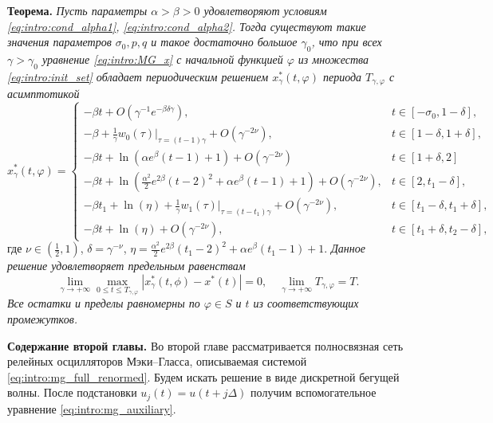 \textbf{Теорема.} \textit{Пусть параметры $\alpha > \beta > 0$ удовлетворяют условиям \eqref{eq:intro:cond_alpha1}, \eqref{eq:intro:cond_alpha2}. Тогда существуют такие значения параметров $\sigma_0, p, q$ и такое достаточно большое $\gamma_0$, что при всех $\gamma > \gamma_0$ уравнение \eqref{eq:intro:MG_x} с начальной функцией $\varphi$ из множества \eqref{eq:intro:init_set} обладает периодическим решением $x^*_\gamma(t, \varphi)$ периода $T_{\gamma, \varphi}$ с асимптотикой}
\footnotesize
\begin{equation}
	\label{eq:intro:sol_x*gamma}
	x^*_\gamma(t, \varphi)= 
	\begin{cases}
		- \beta t + O(\gamma^{-1} e^{-\beta \delta \gamma}), & t\in[-\sigma_0, 1 - \delta],\\
		-\beta + \frac{1}{\gamma} w_0(\tau)|_{\tau=(t - 1)\gamma} + O(\gamma^{-2\nu}), & t \in [1 - \delta,1 + \delta],\\
		- \beta t + \ln(\alpha e^{\beta}(t - 1) + 1) + O(\gamma^{-2\nu}) & t\in[1 + \delta, 2]\\
		- \beta t + \ln(\frac{\alpha^2}{2}e^{2 \beta}(t - 2)^2 + \alpha e^{\beta}(t - 1) + 1) + O(\gamma^{-2\nu}), & t \in [2, t_1 - \delta],\\
		- \beta t_1 + \ln(\eta)+\frac{1}{\gamma} w_1(\tau)|_{\tau=(t - t_1)\gamma} + O(\gamma^{-2\nu}), & t\in[t_1 - \delta, t_1  +\delta],\\
		- \beta t + \ln(\eta) + O(\gamma^{-2\nu}), & t \in [t_1 + \delta, t_2 - \delta],
	\end{cases}
\end{equation}
\normalsize
где $\nu \in (\frac{1}{2}, 1)$, $\delta = \gamma^{-\nu}$, $\eta=\frac{\alpha^2}{2}e^{2\beta}(t_1 - 2)^2 + \alpha e^{\beta}(t_1 - 1) + 1$.
%
\textit{Данное решение удовлетворяет предельным равенствам}
%
\begin{equation}
	\label{eq:intro:lim_x*}
	\lim_{\gamma\to+\infty}\max_{0\leqslant t\leqslant T_{\gamma, \varphi}}|x_{\gamma}^*(t, \phi)-x^*(t)|=0,\quad \lim_{\gamma\to+\infty}T_{\gamma, \varphi} = T.
\end{equation}
\textit{Все остатки и пределы равномерны по $\varphi \in S$ и $t$ из соответствующих промежутков.}

\textbf{Содержание второй главы.} Во второй главе рассматривается полносвязная сеть релейных осцилляторов Мэки--Гласса, описываемая системой \eqref{eq:intro:mg_full_renormed}. Будем искать решение в виде дискретной бегущей волны. После подстановки $u_j(t) = u(t + j\Delta)$ получим вспомогательное уравнение \eqref{eq:intro:mg_auxiliary}.

